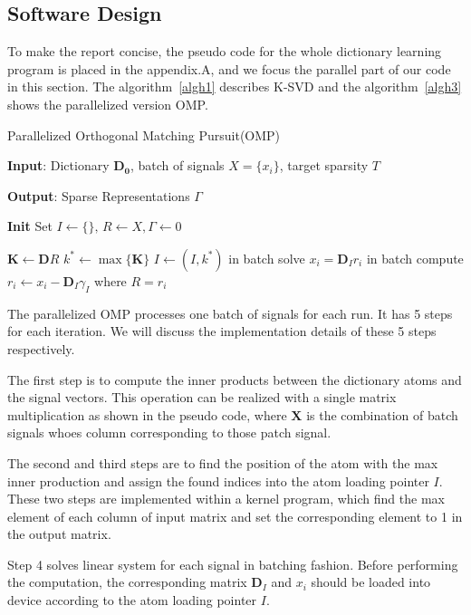 \documentclass[english]{cccconf}
\begin{document}
\subsection{Software Design}

To make the report concise, the pseudo code for the whole dictionary learning program is placed in the appendix.A, and we focus the parallel part of our code in this section. The algorithm~\ref{algh1} describes K-SVD and the algorithm~\ref{algh3} shows the parallelized version OMP.

\begin{algorithm}[H]
	\caption{Parallelized Orthogonal Matching Pursuit(OMP)} 
	\label{algh3}
	\begin{algorithmic}
		\STATE \textbf{Input}: Dictionary \(\mathbf{D_0}\), batch of signals \(X = \{x_i\}\), target sparsity \(T\)   
		
		\STATE \textbf{Output}: Sparse Representations \(\Gamma\) 
		
		\STATE \textbf{Init} Set \(I\leftarrow\{\},\,R\leftarrow X,\Gamma\leftarrow0\)
		
		\STATE \(\mathbf{K}\leftarrow \mathbf{D}R \)
		\STATE \(k^* \leftarrow \max{\{\mathbf{K}\}}\)
		\STATE \(I \leftarrow (I,k^*)\)
		\STATE in batch solve \(x_i = \mathbf{D}_Ir_i\)
		\STATE in batch compute \(r_i\leftarrow x_i - \mathbf{D}_I\gamma_I\) where \(R = {r_i}\)
		\ENDFOR
	\end{algorithmic}
\end{algorithm}

The parallelized OMP processes one batch of signals for each run. It has 5 steps for each iteration. We will discuss the implementation details of these 5 steps respectively.

The first step is to compute the inner products between the dictionary atoms and the signal vectors. This operation can be realized with a single matrix multiplication as shown in the pseudo code, where \(\mathbf{X}\) is the combination of batch signals whoes column corresponding to those patch signal.

The second and third steps are to find the position of the atom with the max inner production and assign the found indices into the atom loading pointer \(I\). These two steps are implemented within a kernel program, which find the max element of each column of input matrix and set the corresponding element to 1 in the output matrix.

Step 4 solves linear system for each signal in batching fashion. Before performing the computation, the corresponding matrix \(\mathbf{D}_I\) and \(x_i\) should be loaded into device according to the atom loading pointer \(I\). 
\end{document}
